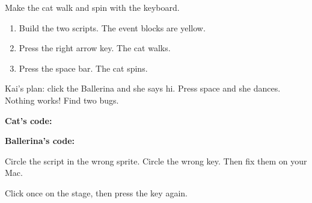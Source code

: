 \begin{exercise}
Make the cat walk and spin with the keyboard.
\begin{enumerate}[leftmargin=1.4em,itemsep=2pt]
  \item Build the two scripts. The event blocks are yellow.
  \item Press the right arrow key. The cat walks.
  \item Press the space bar. The cat spins.
\end{enumerate}
\begin{center}
\begin{scratch}[scale=0.85]
\end{scratch}
\qquad
\begin{scratch}[scale=0.85]
\end{scratch}
\end{center}
\end{exercise}

\begin{exercise}
Kai's plan: click the Ballerina and she says hi. Press space and she dances. Nothing works! Find two bugs.

\textbf{Cat's code:}
\begin{center}
\begin{scratch}[scale=0.85]
\end{scratch}
\end{center}

\textbf{Ballerina's code:}
\begin{center}
\begin{scratch}[scale=0.85]
\end{scratch}
\end{center}
Circle the script in the wrong sprite. Circle the wrong key. Then fix them on your Mac.
\end{exercise}

\begin{grownup}
Click once on the stage, then press the key again.
\end{grownup}


